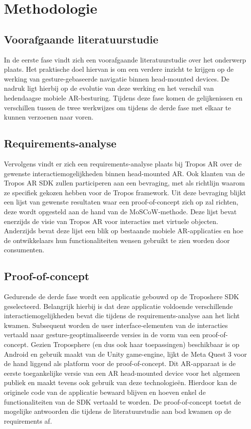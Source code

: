 \section{Methodologie}%
\label{sec:methodologie}
\subsection{Voorafgaande literatuurstudie}
\label{subsec:literature-study}
In de eerste fase vindt zich een voorafgaande literatuurstudie over het onderwerp plaats. %
Het praktische doel hiervan is om een verdere inzicht te krijgen op de werking van gesture-gebaseerde navigatie binnen head-mounted devices.
De nadruk ligt hierbij op de evolutie van deze werking en het verschil van hedendaagse mobiele AR-besturing.
Tijdens deze fase komen de gelijkenissen en verschillen tussen de twee werkwijzes om tijdens de derde fase met elkaar te kunnen verzoenen naar voren.

\subsection{Requirements-analyse}
\label{subsec:requirements-analysis}
Vervolgens vindt er zich een requirements-analyse plaats bij Tropos AR over de gewenste interactiemogelijkheden binnen head-mounted AR. %
Ook klanten van de Tropos AR SDK zullen participeren aan een bevraging, met als richtlijn waarom ze specifiek gekozen hebben voor de Tropos framework.
Uit deze bevraging blijkt een lijst van gewenste resultaten waar een proof-of-concept zich op zal richten, deze wordt opgesteld aan de hand van de MoSCoW-methode.
Deze lijst bevat enerzijds de visie van Tropos AR voor interacties met virtuele objecten.
Anderzijds bevat deze lijst een blik op bestaande mobiele AR-applicaties en hoe de ontwikkelaars hun functionaliteiten wensen gebruikt te zien worden door consumenten.

\subsection{Proof-of-concept}
\label{subsec:poc}
Gedurende de derde fase wordt een applicatie gebouwd op de Troposhere SDK geselecteerd. %
Belangrijk hierbij is dat deze applicatie voldoende verschillende interactiemogelijkheden bevat die tijdens de requirements-analyse aan het licht kwamen.
Subsequent worden de user interface-elementen van de interacties vertaald naar gesture-geoptimaliseerde versies in de vorm van een proof-of-concept.
Gezien Troposphere (en dus ook haar toepassingen) beschikbaar is op Android en gebruik maakt van de Unity game-engine, lijkt de Meta Quest 3 voor de hand liggend als platform voor de proof-of-concept.
Dit AR-apparaat is de eerste toegankelijke versie van een AR head-mounted device voor het algemeen publiek en maakt tevens ook gebruik van deze technologie\"en.
Hierdoor kan de originele code van de applicatie bewaard blijven en hoeven enkel de functionaliteiten van de SDK vertaald te worden.
De proof-of-concept toetst de mogelijke antwoorden die tijdens de literatuurstudie aan bod kwamen op de requirements af.

